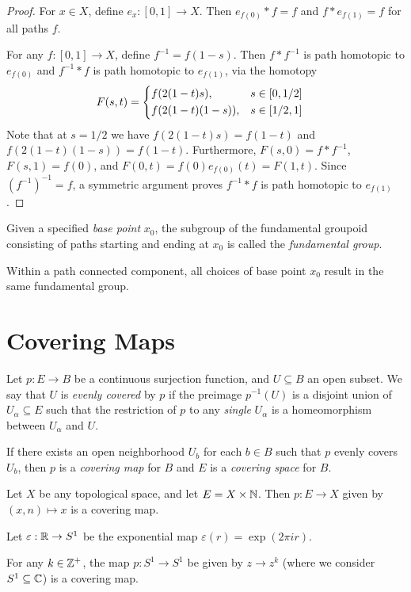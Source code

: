 \begin{proof}
    For $x \in X$, define $e_x: [0, 1] \to X$. Then $e_{f(0)} * f = f$ and $f * e_{f(1)} = f$ for all paths $f$.

    For any $f: [0, 1] \to X$, define $f^{-1} = f(1-s)$. Then $f * f^{-1}$ is path homotopic to $e_{f(0)}$ and $f^{-1} * f$ is path homotopic to $e_{f(1)}$, via the homotopy
    \begin{align*}
        F(s, t) &= \begin{dcases}
            f(2(1-t)s), &s \in [0, 1/2] \\
            f(2(1-t)(1-s)), &s \in [1/2, 1]
        \end{dcases}
    \end{align*}
    Note that at $s = 1/2$ we have $f(2(1-t)s) = f(1-t)$ and $f(2(1-t)(1-s)) = f(1-t)$. Furthermore, $F(s, 0) = f * f^{-1}$, $F(s, 1) = f(0)$, and $F(0, t) = f(0) e_{f(0)}(t) = F(1, t)$. Since $(f^{-1})^{-1} = f$, a symmetric argument proves $f^{-1} * f$ is path homotopic to $e_{f(1)}$.
\end{proof}

\begin{defn}
    Given a specified \emph{base point} $x_0$, the subgroup of the fundamental groupoid consisting of paths starting and ending at $x_0$ is called the \emph{fundamental group}.
\end{defn}

\begin{prop}
    Within a path connected component, all choices of base point $x_0$ result in the same fundamental group.
\end{prop}

\section{Covering Maps}

\begin{defn}
    Let $p: E \to B$ be a continuous surjection function, and $U \subseteq B$ an open subset. We say that $U$ is \emph{evenly covered} by $p$ if the preimage $p^{-1}(U)$ is a disjoint union of $U_{\alpha} \subseteq E$ such that the restriction of $p$ to any \emph{single} $U_{\alpha}$ is a homeomorphism between $U_{\alpha}$ and $U$.

    If there exists an open neighborhood $U_b$ for each $b \in B$ such that $p$ evenly covers $U_b$, then $p$ is a \emph{covering map} for $B$ and $E$ is a \emph{covering space} for $B$.
\end{defn}

\begin{exmp}
    Let $X$ be any topological space, and let $E = X \times \mathbb{N}$. Then $p: E \to X$ given by $(x, n) \mapsto x$ is a covering map.

    Let $\varepsilon: \mathbb{R} \to S^1$ be the exponential map $\varepsilon(r) = \exp(2\pi i r)$.

    For any $k \in \mathbb{Z}^+$, the map $p: S^1 \to S^1$ be given by $z \to z^{k}$ (where we consider $S^1 \subseteq \mathbb{C}$) is a covering map.
\end{exmp}

